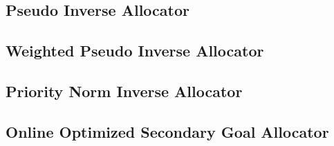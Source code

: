 \subsection{Pseudo Inverse Allocator}
\subsection{Weighted Pseudo Inverse Allocator}
\subsection{Priority Norm Inverse Allocator}
\subsection{Online Optimized Secondary Goal Allocator}
